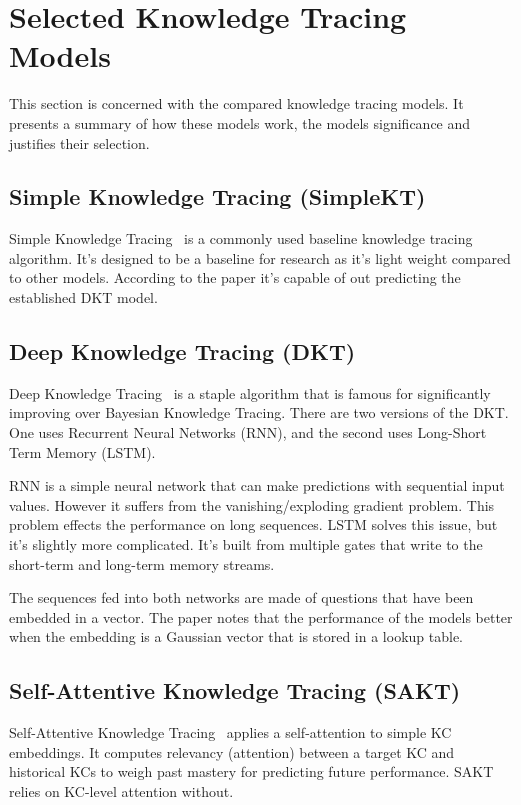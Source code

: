 \section{Selected Knowledge Tracing Models}
This section is concerned with the compared knowledge tracing models. It presents a summary of how these models work, the models significance and justifies their selection.

\subsection{Simple Knowledge Tracing (SimpleKT)}
Simple Knowledge Tracing~\autocite{simpleKT} is a commonly used baseline knowledge tracing algorithm. It's designed to be a baseline for research as it's light weight compared to other models. According to the paper it's capable of out predicting the established DKT model.

\subsection{Deep Knowledge Tracing (DKT)}

Deep Knowledge Tracing~\autocite{dkt} is a staple algorithm that is famous for significantly improving over Bayesian Knowledge Tracing. There are two versions of the DKT\@. One uses Recurrent Neural Networks (RNN), and the second uses Long-Short Term Memory (LSTM).

RNN is a simple neural network that can make predictions with sequential input values. However it suffers from the vanishing/exploding gradient problem. This problem effects the performance on long sequences.
LSTM solves this issue, but it's slightly more complicated. It's built from multiple gates that write to the short-term and long-term memory streams.

The sequences fed into both networks are made of questions that have been embedded in a vector. The paper notes that the performance of the models better when the embedding is a Gaussian vector that is stored in a lookup table.

\subsection{Self-Attentive Knowledge Tracing (SAKT)}
Self-Attentive Knowledge Tracing~\autocite{sakt} applies a self-attention to simple KC embeddings. It computes relevancy (attention) between a target KC and historical KCs to weigh past mastery for predicting future performance. SAKT relies on KC-level attention without.

